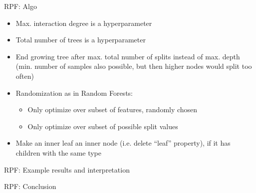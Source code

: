 \documentclass[10pt,compress,t,notes=noshow, xcolor=table]{beamer}
\begin{document}
\begin{frame}{RPF: Algo}

\begin{itemize}
    \item Max. interaction degree is a hyperparameter
    \item Total number of trees is a hyperparameter
    \item End growing tree after max. total number of splits instead of max. depth \\
    (min. number of samples also possible, but then higher nodes would split too often)
    \item Randomization as in Random Forests:
    \begin{itemize}
        \item Only optimize over subset of features, randomly chosen
        \item Only optimize over subset of possible split values
    \end{itemize}
    \item Make an inner leaf an inner node (i.e. delete ``leaf'' property), if it has children with the same type
\end{itemize}
    
\end{frame}

\begin{frame}{RPF: Example results and interpretation}
    
\end{frame}

\begin{frame}{RPF: Conclusion}
    
\end{frame}

\endlecture
\end{document}

